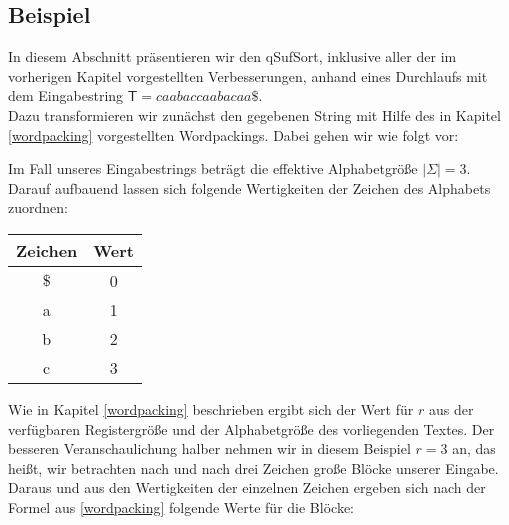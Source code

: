 \usetikzlibrary{decorations.pathreplacing,calc}

\newcommand{\tikzmark}[2][-3pt]{\tikz[remember picture, overlay, baseline=-0.5ex]\node[#1](#2){};}

\setcounter{arrow}{0}
\newcommand{\drawcurvedarrow}[3][]{%
 \refstepcounter{arrow}
 \tikz[remember picture, overlay]\draw (#2.center)edge[#1]node[coordinate,pos=0.5, name=arrow-\thearrow]{}(#3.center);
}

\newcommand{\annote}[3][]{%
 \tikz[remember picture, overlay]\node[#1] at (#2) {#3};
}

\subsection{Beispiel}
\label{qsufsort:example}
In diesem Abschnitt präsentieren wir den qSufSort, inklusive aller der im vorherigen Kapitel vorgestellten Verbesserungen, anhand eines Durchlaufs mit dem Eingabestring $\mathsf{T} = caabaccaabacaa\$$.\\
Dazu transformieren wir zunächst den gegebenen String mit Hilfe des in Kapitel \ref{wordpacking} vorgestellten Wordpackings. Dabei gehen wir wie folgt vor: 

Im Fall unseres Eingabestrings beträgt die effektive Alphabetgröße $|\Sigma| = 3$. Darauf aufbauend lassen sich folgende Wertigkeiten der Zeichen des Alphabets zuordnen:

\begin{center}

\begin{tabular}{c | c}
Zeichen & Wert \\
\hline
$\$$ & 0 \\
a & 1 \\
b & 2 \\
c & 3 
\end{tabular}
\end{center}

Wie in Kapitel \ref{wordpacking} beschrieben ergibt sich der Wert für $r$ aus der verfügbaren Registergröße und der Alphabetgröße des vorliegenden Textes. Der besseren Veranschaulichung halber nehmen wir in diesem Beispiel $r=3$ an, das heißt, wir betrachten nach und nach drei Zeichen große Blöcke unserer Eingabe. Daraus und aus den Wertigkeiten der einzelnen Zeichen ergeben sich nach der Formel aus \ref{wordpacking} folgende Werte für die Blöcke: 


